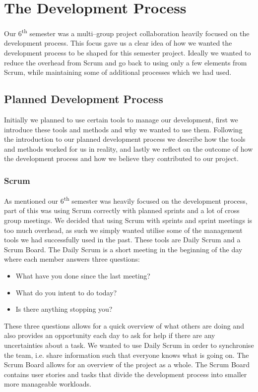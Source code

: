 \section{The Development Process}
Our 6\textsuperscript{th} semester was a multi--group project collaboration heavily focused on the development process.
This focus gave us a clear idea of how we wanted the development process to be shaped for this semester project.
Ideally we wanted to reduce the overhead from Scrum and go back to using only a few elements from Scrum, while maintaining some of additional processes which we had used.
\subsection{Planned Development Process}
Initially we planned to use certain tools to manage our development, first we introduce these tools and methods and why we wanted to use them.
Following the introduction to our planned development process we describe how the tools and methods worked for us in reality, and lastly we reflect on the outcome of how the development process and how we believe they contributed to our project.
\subsubsection{Scrum}
As mentioned our 6\textsuperscript{th} semester was heavily focused on the development process, part of this was using Scrum correctly with planned sprints and a lot of cross group meetings.
We decided that using Scrum with sprints and sprint meetings is too much overhead, as such we simply wanted utilise some of the management tools we had successfully used in the past.
These tools are Daily Scrum and a Scrum Board.
The Daily Scrum is a short meeting in the beginning of the day where each member answers three questions:
\begin{itemize}
    \item What have you done since the last meeting?
    \item What do you intent to do today?
    \item Is there anything stopping you?
\end{itemize}
These three questions allows for a quick overview of what others are doing and also provides an opportunity each day to ask for help if there are any uncertainties about a task.
We wanted to use Daily Scrum in order to synchronise the team, i.e. share information such that everyone knows what is going on.
The Scrum Board allows for an overview of the project as a whole.
The Scrum Board contains user stories and tasks that divide the development process into smaller more manageable workloads.

